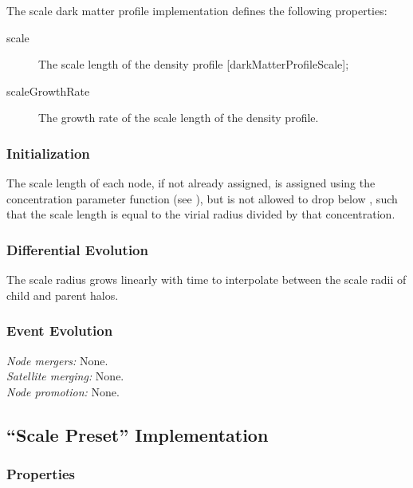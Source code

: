 The scale dark matter profile implementation defines the following properties:
\begin{description}
 \item [{\normalfont \ttfamily scale}] The scale length of the density profile [{\normalfont \ttfamily darkMatterProfileScale}];
 \item [{\normalfont \ttfamily scaleGrowthRate}] The growth rate of the scale length of the density profile.
\end{description}

\subsubsection{Initialization}

The scale length of each node, if not already assigned, is assigned using the concentration parameter function (see ), but is not allowed to drop below {\normalfont \ttfamily [darkMatterProfileMinimumConcentration]}, such that the scale length is equal to the virial radius divided by that concentration.

\subsubsection{Differential Evolution}

The scale radius grows linearly with time to interpolate between the scale radii of child and parent halos.

\subsubsection{Event Evolution}

\noindent\emph{Node mergers:} None.\\

\noindent\emph{Satellite merging:} None.\\

\noindent\emph{Node promotion:} None.\\

\subsection{``Scale Preset'' Implementation}\label{sec:DarkMatterProfileScalePreset}

\subsubsection{Properties}

